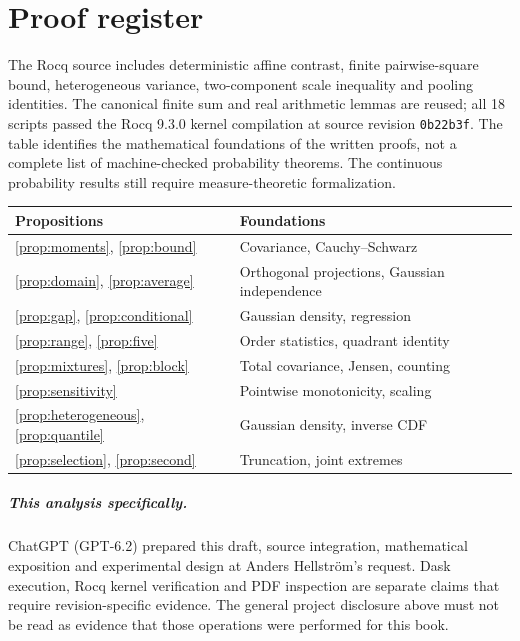 \chapter{Proof register}
The Rocq source includes deterministic affine contrast, finite pairwise-square
bound, heterogeneous variance, two-component scale inequality and pooling
identities. The canonical finite sum and real arithmetic lemmas are reused;
all 18 scripts passed the Rocq 9.3.0 kernel compilation at source
revision \texttt{0b22b3f}. The table identifies the mathematical
foundations of the written proofs, not a complete list of machine-checked
probability theorems. The continuous probability results still require
measure-theoretic formalization.
\begin{tabular}{ll}
\toprule
Propositions & Foundations \\
\midrule
\ref{prop:moments}, \ref{prop:bound} & Covariance, Cauchy--Schwarz \\
\ref{prop:domain}, \ref{prop:average} & Orthogonal projections, Gaussian independence \\
\ref{prop:gap}, \ref{prop:conditional} & Gaussian density, regression \\
\ref{prop:range}, \ref{prop:five} & Order statistics, quadrant identity \\
\ref{prop:mixtures}, \ref{prop:block} & Total covariance, Jensen, counting \\
\ref{prop:sensitivity} & Pointwise monotonicity, scaling \\
\ref{prop:heterogeneous}, \ref{prop:quantile} & Gaussian density, inverse CDF \\
\ref{prop:selection}, \ref{prop:second} & Truncation, joint extremes \\
\bottomrule
\end{tabular}
\ProjectReportAIAppendix
\paragraph{This analysis specifically.} ChatGPT (GPT-6.2) prepared this draft, source integration, mathematical exposition and experimental design at Anders Hellström's request. Dask execution, Rocq kernel verification and PDF inspection are separate claims that require revision-specific evidence. The general project disclosure above must not be read as evidence that those operations were performed for this book.

